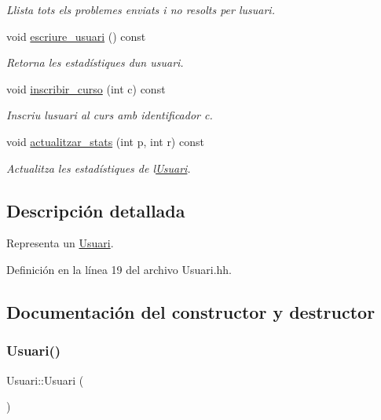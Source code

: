 \begin{DoxyCompactItemize}
\begin{DoxyCompactList}\small\item\em Llista tots els problemes enviats i no resolts per l\textquotesingle{}usuari. \end{DoxyCompactList}\item 
void \mbox{\hyperlink{class_usuari_ad13c0b52f5430b0b400c7e3ac6611310}{escriure\+\_\+usuari}} () const
\begin{DoxyCompactList}\small\item\em Retorna les estadístiques d\textquotesingle{}un usuari. \end{DoxyCompactList}\item 
void \mbox{\hyperlink{class_usuari_aa67a0b994110236e30d9eac0ebf45fc7}{inscribir\+\_\+curso}} (int c) const
\begin{DoxyCompactList}\small\item\em Inscriu l\textquotesingle{}usuari al curs amb identificador c. \end{DoxyCompactList}\item 
void \mbox{\hyperlink{class_usuari_a5721999c4381ccf24520dfcdda798587}{actualitzar\+\_\+stats}} (int p, int r) const
\begin{DoxyCompactList}\small\item\em Actualitza les estadístiques de l\textquotesingle{}\mbox{\hyperlink{class_usuari}{Usuari}}. \end{DoxyCompactList}\end{DoxyCompactItemize}


\subsection{Descripción detallada}
Representa un \mbox{\hyperlink{class_usuari}{Usuari}}. 

Definición en la línea 19 del archivo Usuari.\+hh.



\subsection{Documentación del constructor y destructor}
\mbox{\label{class_usuari_ac6a1fbc3d6967c6de677580c60dfaaf4}} 
\subsubsection{\texorpdfstring{Usuari()}{Usuari()}\hspace{0.1cm}{\footnotesize\ttfamily [1/2]}}
{\footnotesize\ttfamily Usuari\+::\+Usuari (\begin{DoxyParamCaption}{ }\end{DoxyParamCaption})}



